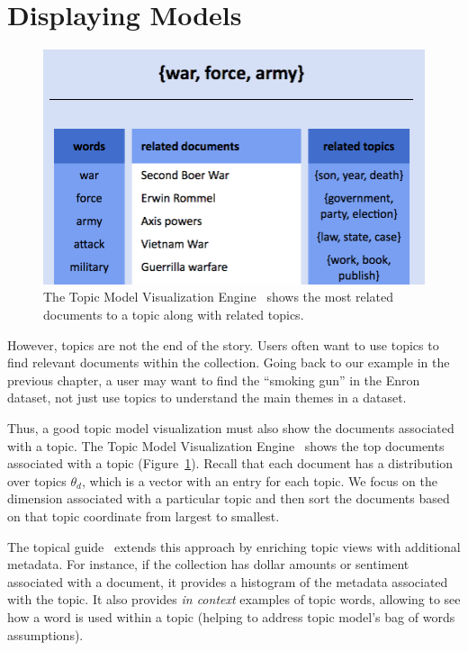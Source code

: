 \section{Displaying Models}

\begin{figure}
  \begin{center}
  \includegraphics[width=.8\linewidth]{figures/viz_tmve}
  \end{center}
  \caption{The Topic Model Visualization Engine~\citep{chaney-12}
    shows the most related documents to a topic along with related topics. }
  \label{fig:tmve}
\end{figure}

However, topics are not the end of the story.  Users often want to use topics to
find relevant documents within the collection.  Going back to our example in the
previous chapter, a user may want to find the ``smoking gun'' in the Enron
dataset, not just use topics to understand the main themes in a dataset.

Thus, a good topic model visualization must also show the documents associated
with a topic.  The Topic Model Visualization Engine~\citep{chaney-12} shows the
top documents associated with a topic (Figure~\ref{fig:tmve}).  Recall that each
document has a distribution over topics $\theta_d$, which is a vector with an
entry for each topic.  We focus on the dimension associated with a particular topic
and then sort the documents based on that topic coordinate from largest to
smallest.

The topical guide~\citep{gardner-10} extends this approach by enriching topic
views with additional metadata.  For instance, if the collection has dollar
amounts or sentiment~\cite{pang-08} associated with a document, it provides a
histogram of the metadata associated with the topic.  It also provides \emph{in
  context} examples of topic words, allowing to see how a word is used within a
topic (helping to address topic model's bag of words assumptions).

